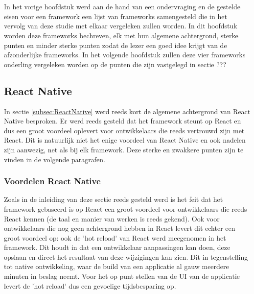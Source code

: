 \chapter{}
\label{ch:eigenschappen-frameworks}

In het vorige hoofdstuk werd aan de hand van een ondervraging \autocite{Liu2020} en de gestelde eisen voor een framework een lijst van frameworks samengesteld die in het vervolg van deze studie met elkaar vergeleken zullen worden. In dit hoofdstuk worden deze frameworks bechreven, elk met hun algemene achtergrond, sterke punten en minder sterke punten zodat de lezer een goed idee krijgt van de afzonderlijke frameworks. In het volgende hoofdstuk zullen deze vier frameworks onderling vergeleken worden op de punten die zijn vastgelegd in sectie ???

\section{React Native}
\label{sec:detailsReactNative}

In sectie \ref{subsec:ReactNative} werd reeds kort de algemene achtergrond van React Native besproken. Er werd reeds gesteld dat het framework steunt op React en dus een groot voordeel oplevert voor ontwikkelaars die reeds vertrouwd zijn met React. Dit is natuurlijk niet het enige voordeel van React Native en ook nadelen zijn aanwezig, net als bij elk framework. Deze sterke en zwakkere punten zijn te vinden in de volgende paragrafen. 

\subsection{Voordelen React Native}
\label{subsec:voordelenReactNative}

Zoals in de inleiding van deze sectie reeds gesteld werd is het feit dat het framework gebaseerd is op React een groot voordeel voor ontwikkelaars die reeds React kennen (de taal en manier van werken is reeds gekend). Ook voor ontwikkelaars die nog geen achtergrond hebben in React levert dit echter een groot voordeel op: ook de 'hot reload' van React werd meegenomen in het framework. Dit houdt in dat een ontwikkelaar aanpassingen kan doen, deze opslaan en direct het resultaat van deze wijzigingen kan zien. Dit in tegenstelling tot native ontwikkeling, waar de build van een applicatie al gauw meerdere minuten in beslag neemt. Voor het op punt stellen van de UI van de applicatie levert de 'hot reload' dus een gevoelige tijdsbesparing op.


